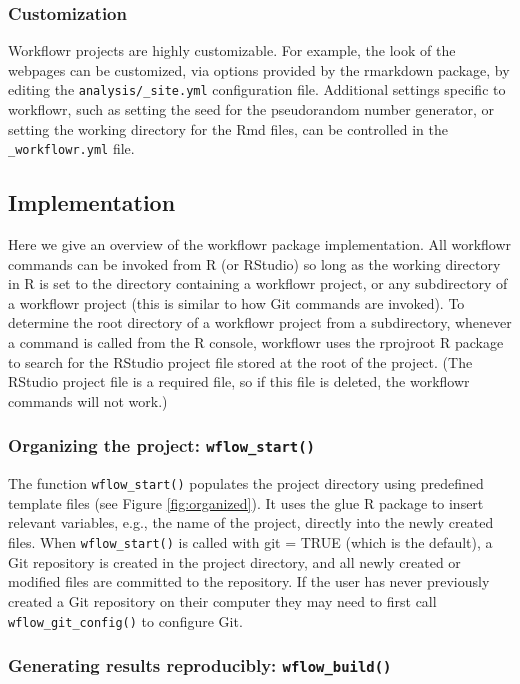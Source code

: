 \documentclass[9pt,a4paper]{extarticle}
\begin{document}
\subsubsection*{Customization}

Workflowr projects are highly customizable. For example, the look of the
webpages can be customized, via options provided by the rmarkdown
package, by editing the \verb|analysis/_site.yml| configuration file.
Additional settings specific to workflowr, such as setting the seed for
the pseudorandom number generator, or setting the working directory for
the Rmd files, can be controlled in the \verb|_workflowr.yml| file.

\subsection*{Implementation}

Here we give an overview of the workflowr package implementation. All workflowr commands can be invoked from R (or RStudio) so long as the working directory in R is set to the directory containing a workflowr project, or any subdirectory of a workflowr project (this is similar to how Git commands are invoked). To determine the root directory of a workflowr project from a subdirectory, whenever a command is called from the R console, workflowr uses the rprojroot R package to search for the RStudio project file stored at the root of the project. (The RStudio project file is a required file, so if this file is deleted, the workflowr commands will not work.)

\subsubsection*{Organizing the project: \texttt{wflow\_start()}}

The function \texttt{wflow\_start()} populates the project directory using
predefined template files (see Figure \ref{fig:organized}). It uses the glue R package to
insert relevant variables, e.g., the name of the project, directly into
the newly created files. When \texttt{wflow\_start()} is called with git = TRUE
(which is the default), a Git repository is created in the project
directory, and all newly created or modified files are committed to the
repository. If the user has never previously created a Git repository on
their computer they may need to first call \texttt{wflow\_git\_config()} to
configure Git.

\subsubsection*{Generating results reproducibly: \texttt{wflow\_build()}}
\end{document}
